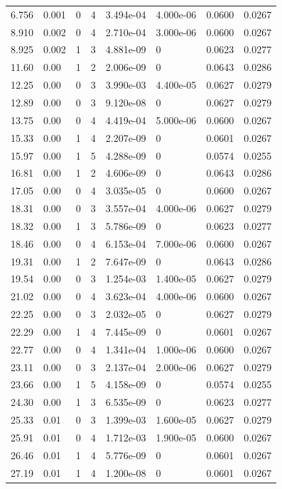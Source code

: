 \documentclass[preview]{standalone}
\begin{document}
{{\begin{tabular}{L{1.2cm}C{1.2cm} C{0.3cm}C{0.5cm} C{1.4cm}C{1.4cm} C{1.4cm}C{1.4cm}}
  6.756  &  0.001  & 0     &  4 &  3.494e-04  & 4.000e-06  & 0.0600 &  0.0267   \\ 
  8.910  &  0.002  & 0     &  4 &  2.710e-04  & 3.000e-06  & 0.0600 &  0.0267   \\ 
  8.925  &  0.002  & 1     &  3 &  4.881e-09  & 0  & 0.0623 &  0.0277   \\ 
  11.60  &  0.00  & 1     &  2 &  2.006e-09  & 0  & 0.0643 &  0.0286   \\ 
  12.25  &  0.00  & 0     &  3 &  3.990e-03  & 4.400e-05  & 0.0627 &  0.0279   \\ 
  12.89  &  0.00  & 0     &  3 &  9.120e-08  & 0  & 0.0627 &  0.0279   \\ 
  13.75  &  0.00  & 0     &  4 &  4.419e-04  & 5.000e-06  & 0.0600 &  0.0267   \\ 
  15.33  &  0.00  & 1     &  4 &  2.207e-09  & 0  & 0.0601 &  0.0267   \\ 
  15.97  &  0.00  & 1     &  5 &  4.288e-09  & 0  & 0.0574 &  0.0255   \\ 
  16.81  &  0.00  & 1     &  2 &  4.606e-09  & 0  & 0.0643 &  0.0286   \\ 
  17.05  &  0.00  & 0     &  4 &  3.035e-05  & 0  & 0.0600 &  0.0267   \\ 
  18.31  &  0.00  & 0     &  3 &  3.557e-04  & 4.000e-06  & 0.0627 &  0.0279   \\ 
  18.32  &  0.00  & 1     &  3 &  5.786e-09  & 0  & 0.0623 &  0.0277   \\ 
  18.46  &  0.00  & 0     &  4 &  6.153e-04  & 7.000e-06  & 0.0600 &  0.0267   \\ 
  19.31  &  0.00  & 1     &  2 &  7.647e-09  & 0  & 0.0643 &  0.0286   \\ 
  19.54  &  0.00  & 0     &  3 &  1.254e-03  & 1.400e-05  & 0.0627 &  0.0279   \\ 
  21.02  &  0.00  & 0     &  4 &  3.623e-04  & 4.000e-06  & 0.0600 &  0.0267   \\ 
  22.25  &  0.00  & 0     &  3 &  2.032e-05  & 0  & 0.0627 &  0.0279   \\ 
  22.29  &  0.00  & 1     &  4 &  7.445e-09  & 0  & 0.0601 &  0.0267   \\ 
  22.77  &  0.00  & 0     &  4 &  1.341e-04  & 1.000e-06  & 0.0600 &  0.0267   \\ 
  23.11  &  0.00  & 0     &  3 &  2.137e-04  & 2.000e-06  & 0.0627 &  0.0279   \\ 
  23.66  &  0.00  & 1     &  5 &  4.158e-09  & 0  & 0.0574 &  0.0255   \\ 
  24.30  &  0.00  & 1     &  3 &  6.535e-09  & 0  & 0.0623 &  0.0277   \\ 
  25.33  &  0.01  & 0     &  3 &  1.399e-03  & 1.600e-05  & 0.0627 &  0.0279   \\ 
  25.91  &  0.01  & 0     &  4 &  1.712e-03  & 1.900e-05  & 0.0600 &  0.0267   \\ 
  26.46  &  0.01  & 1     &  4 &  5.776e-09  & 0  & 0.0601 &  0.0267   \\ 
  27.19  &  0.01  & 1     &  4 &  1.200e-08  & 0  & 0.0601 &  0.0267   \\ 
\hline 
\end{tabular} 

}}
\end{document}
